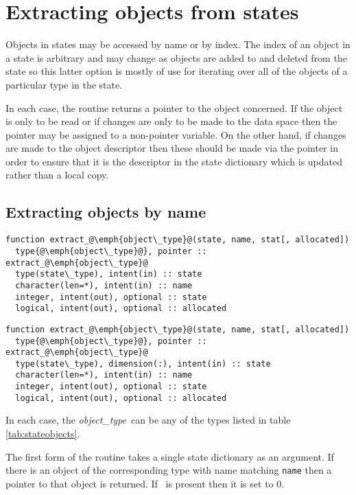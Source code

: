 \documentclass[a4paper, 11pt]{book}
\begin{document}
\section{Extracting objects from states}

Objects in states may be accessed by name or by index. The index of an
object in a state is arbitrary and may change as objects are added to and
deleted from the state so this latter option is mostly of use for iterating
over all of the objects of a particular type in the state. 

In each case, the routine returns a pointer to the object concerned. If the
object is only to be read or if changes are only to be made to the data
space then the pointer may be assigned to a non-pointer variable. On the
other hand, if changes are made to the object descriptor then these should be
made via the pointer in order to ensure that it is the descriptor in the
state dictionary which is updated rather than a local copy.

\subsection{Extracting objects by name}
  
\begin{lstlisting}
function extract_@\emph{object\_type}@(state, name, stat[, allocated])
  type{@\emph{object\_type}@}, pointer :: extract_@\emph{object\_type}@ 
  type(state\_type), intent(in) :: state
  character(len=*), intent(in) :: name
  integer, intent(out), optional :: state
  logical, intent(out), optional :: allocated
\end{lstlisting}

\begin{lstlisting}
function extract_@\emph{object\_type}@(state, name, stat[, allocated])
  type{@\emph{object\_type}@}, pointer :: extract_@\emph{object\_type}@ 
  type(state\_type), dimension(:), intent(in) :: state
  character(len=*), intent(in) :: name
  integer, intent(out), optional :: state
  logical, intent(out), optional :: allocated
\end{lstlisting}

In each case, the \emph{object\_type}\ can be any of the types listed in
table \ref{tab:stateobjects}. 

The first form of the routine takes a single state dictionary as an
argument. If there is an object of the corresponding type with name matching
\lstinline+name+ then a pointer to that object is returned. If
\stat\ is present then it is set to 0.
\end{document}
